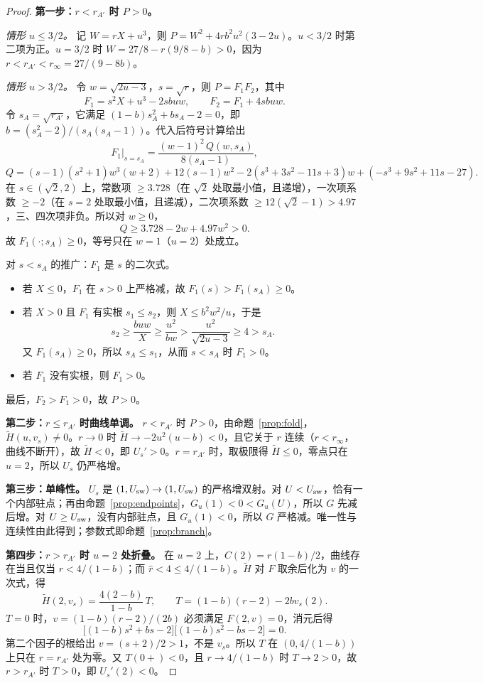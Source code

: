 \documentclass[11pt,a4paper]{ctexart}
\theoremstyle{definition}
\theoremstyle{definition}
\newcommand{\Usw}{U_{\rm sw}}
\newcommand{\rA}{r_{A'}}
\newcommand{\rhat}{\hat r}
\newcommand{\rinf}{r_{\infty}}
\begin{document}
\begin{proof}
\textbf{第一步：$r<\rA$ 时 $P>0$。}

\emph{情形 $u\le3/2$。} 记 $W=rX+u^3$，则 $P=W^2+4rb^2u^2(3-2u)$。$u<3/2$ 时第二项为正。$u=3/2$ 时 $W=27/8-r(9/8-b)>0$，因为 $r<\rA<\rinf=27/(9-8b)$。

\emph{情形 $u>3/2$。} 令 $w=\sqrt{2u-3}$，$s=\sqrt r$，则 $P=F_1F_2$，其中
\[
F_1=s^2X+u^3-2sbuw,\qquad F_2=F_1+4sbuw .
\]
令 $s_A=\sqrt{\rA}$，它满足 $(1-b)s_A^2+bs_A-2=0$，即 $b=(s_A^2-2)/(s_A(s_A-1))$。代入后符号计算给出
\[
F_1\big|_{s=s_A}=\frac{(w-1)^2\,Q(w,s_A)}{8(s_A-1)},
\]
\[
Q=(s-1)(s^2+1)w^3(w+2)+12(s-1)w^2-2(s^3+3s^2-11s+3)w+(-s^3+9s^2+11s-27).
\]
在 $s\in(\sqrt2,2)$ 上，常数项 $\ge3.728$（在 $\sqrt2$ 处取最小值，且递增），一次项系数 $\ge-2$（在 $s=2$ 处取最小值，且递减），二次项系数 $\ge12(\sqrt2-1)>4.97$，三、四次项非负。所以对 $w\ge0$，
\[
Q\ge3.728-2w+4.97w^2>0 .
\]
故 $F_1(\cdot;s_A)\ge0$，等号只在 $w=1$（$u=2$）处成立。

对 $s<s_A$ 的推广：$F_1$ 是 $s$ 的二次式。
\begin{itemize}
\item 若 $X\le0$，$F_1$ 在 $s>0$ 上严格减，故 $F_1(s)>F_1(s_A)\ge0$。
\item 若 $X>0$ 且 $F_1$ 有实根 $s_1\le s_2$，则 $X\le b^2w^2/u$，于是
\[
s_2\ge\frac{buw}{X}\ge\frac{u^2}{bw}>\frac{u^2}{\sqrt{2u-3}}\ge4>s_A .
\]
又 $F_1(s_A)\ge0$，所以 $s_A\le s_1$，从而 $s<s_A$ 时 $F_1>0$。
\item 若 $F_1$ 没有实根，则 $F_1>0$。
\end{itemize}
最后，$F_2>F_1>0$，故 $P>0$。

\textbf{第二步：$r\le\rA$ 时曲线单调。} $r<\rA$ 时 $P>0$，由命题~\ref{prop:fold}，$\tilde H(u,v_s)\neq0$。$r\to0$ 时 $\tilde H\to-2u^2(u-b)<0$，且它关于 $r$ 连续（$r<\rinf$，曲线不断开），故 $\tilde H<0$，即 $U_s'>0$。$r=\rA$ 时，取极限得 $\tilde H\le0$，零点只在 $u=2$，所以 $U_s$ 仍严格增。

\textbf{第三步：单峰性。} $U_s$ 是 $(1,\Usw)\to(1,\Usw)$ 的严格增双射。对 $U<\Usw$，恰有一个内部驻点；再由命题~\ref{prop:endpoints}，$G_u(1)<0<G_u(U)$，所以 $G$ 先减后增。对 $U\ge\Usw$，没有内部驻点，且 $G_u(1)<0$，所以 $G$ 严格减。唯一性与连续性由此得到；参数式即命题~\ref{prop:branch}。

\textbf{第四步：$r>\rA$ 时 $u=2$ 处折叠。} 在 $u=2$ 上，$C(2)=r(1-b)/2$，曲线存在当且仅当 $r<4/(1-b)$；而 $\rhat<4\le4/(1-b)$。$\tilde H$ 对 $F$ 取余后化为 $v$ 的一次式，得
\[
\tilde H(2,v_s)=\frac{4(2-b)}{1-b}\,T,\qquad T=(1-b)(r-2)-2bv_s(2).
\]
$T=0$ 时，$v=(1-b)(r-2)/(2b)$ 必须满足 $F(2,v)=0$，消元后得
\[
\bigl[(1-b)s^2+bs-2\bigr]\bigl[(1-b)s^2-bs-2\bigr]=0 .
\]
第二个因子的根给出 $v=(s+2)/2>1$，不是 $v_s$。所以 $T$ 在 $(0,4/(1-b))$ 上只在 $r=\rA$ 处为零。又 $T(0+)<0$，且 $r\to4/(1-b)$ 时 $T\to2>0$，故 $r>\rA$ 时 $T>0$，即 $U_s'(2)<0$。


\end{proof}
\end{document}
